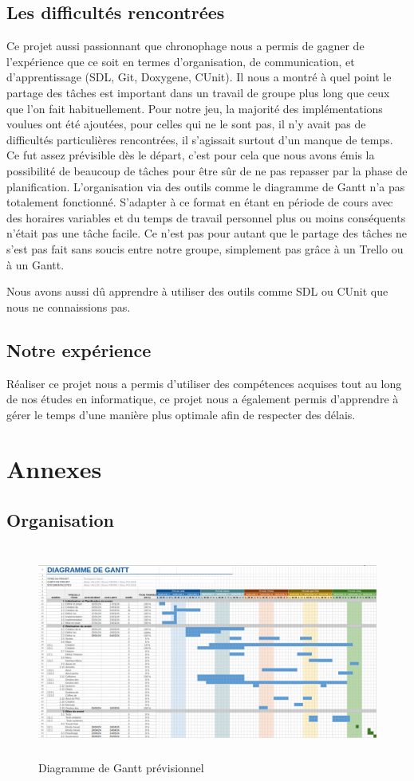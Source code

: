 \documentclass{article}
\begin{document}
\subsection{Les difficultés rencontrées}

Ce projet aussi passionnant que chronophage nous a permis de gagner de l'expérience que ce soit en termes d'organisation, de communication, et d'apprentissage (SDL, Git, Doxygene, CUnit). Il nous a montré à quel point le partage des tâches est important dans un travail de groupe plus long que ceux que l'on fait habituellement.
Pour notre jeu, la majorité des implémentations voulues ont été ajoutées, pour celles qui ne le sont pas, il n'y avait pas de difficultés particulières rencontrées, il s'agissait surtout d'un manque de temps. Ce fut assez prévisible dès le départ, c'est pour cela que nous avons émis la possibilité de beaucoup de tâches pour être sûr de ne pas repasser par la phase de planification.
L'organisation via des outils comme le diagramme de Gantt n'a pas totalement fonctionné. S'adapter à ce format en étant en période de cours avec des horaires variables et du temps de travail personnel plus ou moins conséquents n'était pas une tâche facile. Ce n'est pas pour autant que le partage des tâches ne s'est pas fait sans soucis entre notre groupe, simplement pas grâce à un Trello ou à un Gantt.

Nous avons aussi dû apprendre à utiliser des outils comme SDL ou CUnit que nous ne connaissions pas. 

\subsection{Notre expérience}

Réaliser ce projet nous a permis d'utiliser des compétences acquises tout au long de nos études en informatique, ce projet nous a également permis d'apprendre à gérer le temps d'une manière plus optimale afin de respecter des délais.
\newpage
\section{Annexes}
 \subsection{Organisation}
    \begin{figure}[h]
    \centering
    \includegraphics[height = 7cm]{ganttEntier.png}
    \caption{Diagramme de Gantt prévisionnel}
    \label{fig:gantt_previsionnel}
    \end{figure}
    
\end{document}
